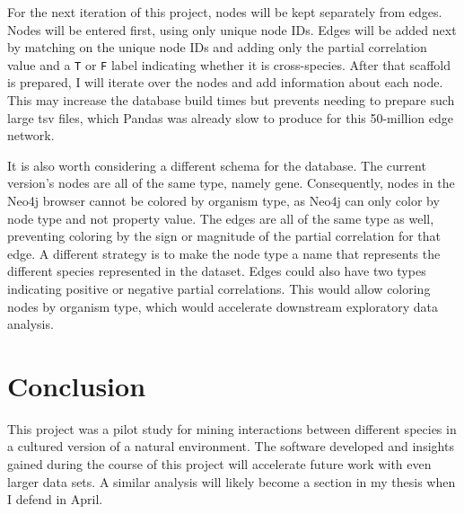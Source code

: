 \documentclass[12pt]{article}
\begin{document}
For the next iteration of this project, nodes will be kept separately from edges.
Nodes will be entered first, using only unique node IDs.
Edges will be added next by matching on the unique node IDs and adding only the partial correlation value and a \texttt{T} or \texttt{F} label indicating whether it is cross-species.
After that scaffold is prepared, I will iterate over the nodes and add information about each node.  
This may increase the database build times but prevents needing to prepare such large tsv files, which Pandas was already slow to produce for this 50-million edge network.

It is also worth considering a different schema for the database.
The current version's nodes are all of the same type, namely gene.  
Consequently, nodes in the Neo4j browser cannot be colored by organism type, as Neo4j can only color by node type and not property value. 
The edges are all of the same type as well, preventing coloring by the sign or magnitude of the partial correlation for that edge. 
A different strategy is to make the node type a name that represents the different species represented in the dataset.
Edges could also have two types indicating positive or negative partial correlations. 
This would allow coloring nodes by organism type, which would accelerate downstream exploratory data analysis. 

\section{Conclusion}
This project was a pilot study for mining interactions between different species in a cultured version of a natural environment.
The software developed and insights gained during the course of this project will accelerate future work with even larger data sets. 
A similar analysis will likely become a section in my thesis when I defend in April. 



 
 
\end{document}
